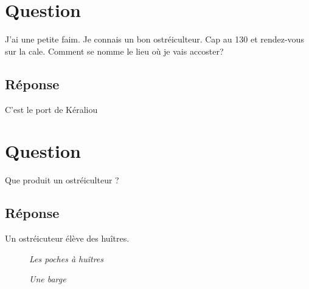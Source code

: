 \documentclass[12pt, report]{article}
\begin{document}
\section{Question}
J’ai une petite faim. Je connais un bon ostréiculteur. Cap au 130 et rendez-vous sur la cale. Comment se nomme le lieu où je vais accoster?
\subsection*{Réponse}
C'est le port de Kéraliou

\section{Question}
Que produit un ostréiculteur ?
\subsection*{Réponse}
Un ostréicuteur élève des huîtres.
\begin{center}
\begin{figure}[ht]
\caption{\textit{Les poches à huîtres}}
\end{figure}
\end{center}
\begin{center}
\begin{figure}[ht]
\caption{\textit{Une barge}}
\end{figure}
\end{center}
\end{document}
